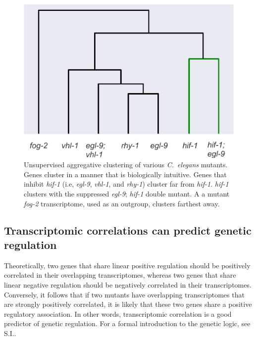 \documentclass[9pt,twocolumn,twoside]{pnas-new}
\newcommand{\cel}{\emph{C.~elegans}}
\newcommand{\egl}{\emph{egl-9}}
\newcommand{\rhy}{\emph{rhy-1}}
\newcommand{\vhl}{\emph{vhl-1}}
\newcommand{\hif}{\emph{hif-1}}
\newcommand{\fog}{\emph{fog-2}}
\begin{document}
\begin{figure}%
\centering
\includegraphics[width=0.75\linewidth]{figs/dendrogram.pdf}
\caption{
Unsupervised aggregative clustering of various \cel{} mutants. Genes
cluster in a manner that is biologically intuitive. Genes that inhibit \hif{}
(i.e, \egl{}, \vhl{}, and \rhy{}) cluster far from \hif{}. \hif{} clusters with
the suppressed \egl{}; \hif{} double mutant. A a mutant \fog{} transcriptome,
used as an outgroup, clusters farthest away.
}
\label{fig:dendrogram}
\end{figure}

\subsection{Transcriptomic correlations can predict genetic regulation}
\label{sub:Transcriptomic genetic analyses}

Theoretically, two genes that share linear positive regulation should be
positively correlated in their overlapping transcriptomes, whereas two genes
that share linear negative regulation should be negatively correlated in their
transcriptomes.
Conversely, it follows that if two mutants have overlapping transcriptomes that
are strongly positively correlated, it is likely that these two genes share a
positive regulatory association. In other words, transcriptomic correlation is
a good predictor of genetic regulation. For a formal introduction to the genetic
logic, see S.I..
\end{document}
